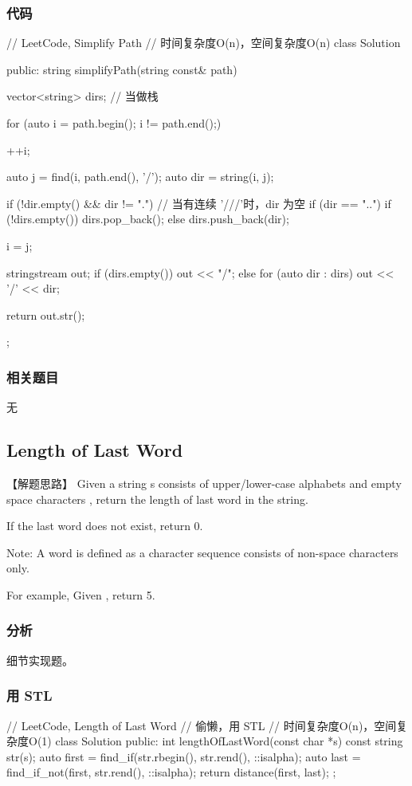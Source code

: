 \subsubsection{代码}
\begin{Code}
	// LeetCode, Simplify Path
	// 时间复杂度O(n)，空间复杂度O(n)
	class Solution {
		public:
		string simplifyPath(string const& path) {
			vector<string> dirs; // 当做栈
			
			for (auto i = path.begin(); i != path.end();) {
				++i;
				
				auto j = find(i, path.end(), '/');
				auto dir = string(i, j);
				
				if (!dir.empty() && dir != ".") {// 当有连续 '///'时，dir 为空
					if (dir == "..") {
						if (!dirs.empty())
						dirs.pop_back();
					} else
					dirs.push_back(dir);
				}
				
				i = j;
			}
			
			stringstream out;
			if (dirs.empty()) {
				out << "/";
			} else {
			for (auto dir : dirs)
			out << '/' << dir;
		}
		
		return out.str();
	}
};
\end{Code}


\subsubsection{相关题目}
\begindot
\item 无
\myenddot


\subsection{Length of Last Word} %
\label{sec:length-of-last-word}


【解题思路】
Given a string s consists of upper/lower-case alphabets and empty space characters , return the length of last word in the string.

If the last word does not exist, return 0.

Note: A word is defined as a character sequence consists of non-space characters only.

For example, 
Given ,
return 5.


\subsubsection{分析}
细节实现题。


\subsubsection{用 STL}
\begin{Code}
	// LeetCode, Length of Last Word
	// 偷懒，用 STL
	// 时间复杂度O(n)，空间复杂度O(1)
	class Solution {
		public:
		int lengthOfLastWord(const char *s) {
			const string str(s);
			auto first = find_if(str.rbegin(), str.rend(), ::isalpha);
			auto last = find_if_not(first, str.rend(), ::isalpha);
			return distance(first, last);
		}
	};
\end{Code}


